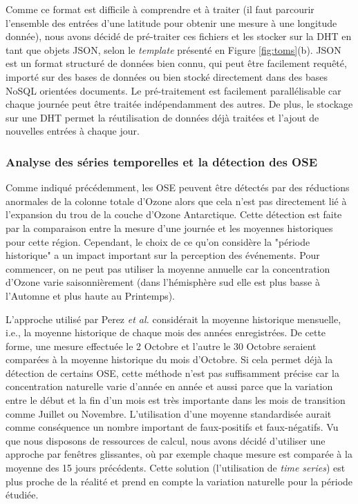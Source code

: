 Comme ce format est difficile à comprendre et à traiter (il faut parcourir l'ensemble des entrées d'une latitude pour obtenir une mesure à une longitude donnée), nous avons décidé de pré-traiter ces fichiers et les stocker sur la DHT en tant que objets JSON, selon le \textit{template} présenté en Figure \ref{fig:toms}(b). JSON est un format structuré de données bien connu, qui peut être facilement requêté, importé sur des bases de données ou bien stocké directement dans des bases NoSQL orientées  documents. Le pré-traitement est facilement parallélisable car chaque journée peut être traitée indépendamment des autres. De plus, le stockage sur une DHT permet la réutilisation de données déjà traitées et l'ajout de nouvelles entrées à chaque jour. 

\subsubsection{Analyse des séries temporelles et la détection des OSE\label{sec:timeseries}}

Comme indiqué précédemment, les OSE peuvent être détectés par des réductions anormales de la colonne totale d'Ozone alors que cela n'est pas directement lié à l'expansion du trou de la couche d'Ozone Antarctique. Cette détection est faite par la comparaison entre la mesure d'une journée et les moyennes historiques pour cette région. Cependant, le choix de ce qu'on considère la "période historique" a un impact important sur la perception des événements. Pour commencer, on ne peut pas utiliser la moyenne annuelle car la concentration d'Ozone varie saisonnièrement (dans l'hémisphère sud elle est plus basse à l'Automne et plus haute au Printemps). 

L'approche utilisé par Perez \textit{et al. }\cite{Peres2013} considérait la moyenne historique mensuelle, i.e., la moyenne historique de chaque mois des années enregistrées. De cette forme, une mesure effectuée le 2 Octobre et l'autre le 30 Octobre seraient comparées à la moyenne historique du mois d'Octobre. Si cela permet déjà la détection de certains OSE, cette méthode n'est pas suffisamment précise car la concentration naturelle varie d'année en année et aussi parce que la variation entre le début et la fin d'un mois est très importante dans les mois de transition comme Juillet ou Novembre. L'utilisation d'une moyenne standardisée aurait comme conséquence un nombre important de faux-positifs et faux-négatifs. Vu que nous disposons de ressources de calcul, nous avons décidé d'utiliser une approche par fenêtres glissantes, où par exemple chaque mesure est comparée à la moyenne des 15 jours précédents. Cette solution (l'utilisation de \textit{time series}) est plus proche de la réalité et prend en compte la variation naturelle pour la période étudiée.

